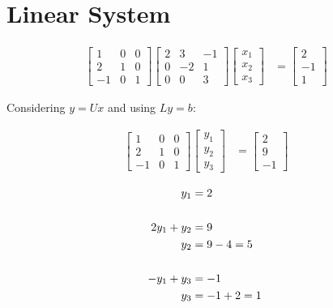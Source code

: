 \section{Linear System}
		
	\begin{align}
		\begin{bmatrix}
			1 & 0 & 0 \\[0.3em]
			2 & 1 & 0 \\[0.3em]
			-1 & 0 & 1
		\end{bmatrix}
		\begin{bmatrix}
			2 & 3 & -1 \\[0.3em]
			0 & -2 & 1 \\[0.3em]
			0 & 0 & 3
		\end{bmatrix}
		\begin{bmatrix}
			x_{1} \\[0.3em]
			x_{2} \\[0.3em]
			x_{3}
		\end{bmatrix}&= \begin{bmatrix}
			2 \\[0.3em]
			-1 \\[0.3em]
			1
		\end{bmatrix}&
	\label{eq:63}
	\end{align}

	Considering $y = Ux$ and using $Ly = b$:

	\begin{align}
		\begin{bmatrix}
			1 & 0 & 0 \\[0.3em]
			2 & 1 & 0 \\[0.3em]
			-1 & 0 & 1
		\end{bmatrix}
		\begin{bmatrix}
			y_{1} \\[0.3em]
			y_{2} \\[0.3em]
			y_{3}
		\end{bmatrix}&= \begin{bmatrix}
			2 \\[0.3em]
			9 \\[0.3em]
			-1
		\end{bmatrix}&
	\label{eq:63y}
	\end{align}

	\begin{align}
		y_{1} &= 2& \\
		\notag \\
		2y_{1} + y_{2} &= 9& \notag \\
		y_{2} &= 9 - 4 = 5& \\
		\notag \\
		-y_{1} + y_{3} &= -1& \notag \\
		y_{3} &= -1 + 2 = 1&
	\end{align}

